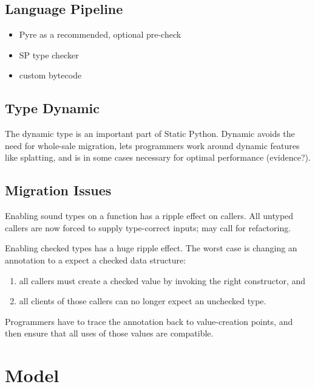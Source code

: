 \documentclass[a4paper,english,cleveref,autoref,thm-restate,anonymous,]{lipics-v2021}
\begin{document}
\subsection{Language Pipeline}

\begin{itemize}
  \item Pyre as a recommended, optional pre-check
  \item SP type checker
  \item custom bytecode
\end{itemize}


\subsection{Type Dynamic}

The dynamic type is an important part of Static Python.
Dynamic avoids the need for whole-sale migration,
lets programmers work around dynamic features like splatting,
and is in some cases necessary for optimal performance (evidence?).


\subsection{Migration Issues}


Enabling sound types on a function has a ripple effect on callers.
All untyped callers are now forced to supply type-correct inputs; may call for
refactoring.

Enabling checked types has a huge ripple effect.
The worst case is changing an annotation to a expect a checked data structure:
\begin{enumerate}
  \item all callers must create a checked value by invoking the right constructor, and
  \item all clients of those callers can no longer expect an unchecked type.
\end{enumerate}
Programmers have to trace the annotation back to value-creation points, and then
ensure that all uses of those values are compatible.


\section{Model}
\label{s:model}
\end{document}
